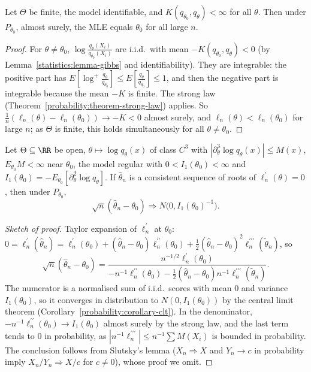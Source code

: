 \begin{theorem}\label{statistics:theorem-mle-consistency}
Let $\Theta$ be finite, the model identifiable, and $K(q_{\theta_0}, q_\theta) < \infty$ for all $\theta$. Then under $P_{\theta_0}$, almost surely, the MLE equals $\theta_0$ for all large $n$.
\end{theorem}

\begin{proof}
For $\theta \neq \theta_0$, $\log\frac{q_\theta(X_i)}{q_{\theta_0}(X_i)}$ are i.i.d.\ with mean $-K(q_{\theta_0}, q_\theta) < 0$ (by Lemma~\ref{statistics:lemma-gibbs} and identifiability). They are integrable: the positive part has
$E[\log^+\frac{q_\theta}{q_{\theta_0}}] \leq E[\frac{q_\theta}{q_{\theta_0}}] \leq 1$, and then the negative part is integrable because the mean $-K$ is finite. The strong law (Theorem~\ref{probability:theorem-strong-law}) applies. So $\frac1n(\ell_n(\theta) - \ell_n(\theta_0)) \to -K < 0$ almost surely, and
$\ell_n(\theta) < \ell_n(\theta_0)$ for large $n$; as $\Theta$ is finite, this holds simultaneously for all $\theta \neq \theta_0$.
\end{proof}

\begin{theorem}\label{statistics:theorem-mle-normality}
Let $\Theta \subseteq \RR$ be open, $\theta \mapsto \log q_\theta(x)$ of class $C^3$ with $|\partial_\theta^3\log q_\theta(x)| \leq M(x)$, $E_{\theta_0}M < \infty$ near $\theta_0$, the model regular with $0 < I_1(\theta_0) < \infty$ and
$I_1(\theta_0) = -E_{\theta_0}[\partial_\theta^2\log q_\theta]$. If $\hat\theta_n$ is a consistent sequence of roots of $\ell_n^{\prime}(\theta) = 0$, then under $P_{\theta_0}$,
\[
\sqrt n(\hat\theta_n - \theta_0) \Rightarrow N\bigl(0, I_1(\theta_0)^{-1}\bigr).
\]
\end{theorem}

\begin{proof}[Sketch of proof]
Taylor expansion of $\ell_n^{\prime}$ at $\theta_0$: $0 = \ell_n^{\prime}(\hat\theta_n) = \ell_n^{\prime}(\theta_0) + (\hat\theta_n - \theta_0)\ell_n^{\prime\prime}(\theta_0) + \frac12(\hat\theta_n - \theta_0)^2\ell_n^{\prime\prime\prime}(\tilde\theta_n)$, so
\[
\sqrt n(\hat\theta_n - \theta_0) = \frac{n^{-1/2}\ell_n^{\prime}(\theta_0)}{-n^{-1}\ell_n^{\prime\prime}(\theta_0) - \frac12(\hat\theta_n - \theta_0)n^{-1}\ell^{\prime\prime\prime}_n(\tilde\theta_n)}.
\]
The numerator is a normalised sum of i.i.d.\ scores with mean $0$ and variance $I_1(\theta_0)$, so it converges in distribution to $N(0, I_1(\theta_0))$ by the central limit theorem (Corollary~\ref{probability:corollary-clt}). In the
denominator, $-n^{-1}\ell_n^{\prime\prime}(\theta_0) \to I_1(\theta_0)$ almost surely by the strong law, and the last term tends to $0$ in probability, as $|n^{-1}\ell^{\prime\prime\prime}_n| \leq n^{-1}\sum M(X_i)$ is bounded in probability. The
conclusion follows from Slutsky's lemma ($X_n \Rightarrow X$ and $Y_n \to c$ in probability imply $X_n/Y_n \Rightarrow X/c$ for $c \neq 0$), whose proof we omit.
\end{proof}

